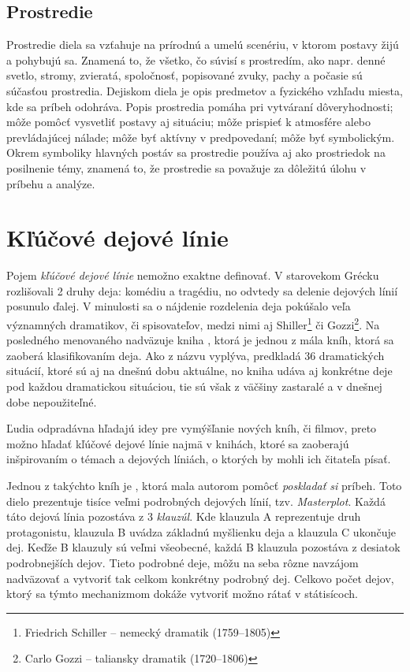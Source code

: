 \subsection*{Prostredie}
Prostredie diela sa vzťahuje na prírodnú a umelú scenériu, v ktorom postavy žijú a pohybujú sa. Znamená to, že všetko, čo súvisí s prostredím, ako napr. denné svetlo, stromy, zvieratá, spoločnosť, popisované zvuky, pachy a počasie sú súčasťou prostredia. Dejiskom diela je opis predmetov a fyzického vzhľadu miesta, kde sa príbeh odohráva.
Popis prostredia pomáha pri vytváraní dôveryhodnosti; môže pomôcť vysvetliť postavy aj situáciu; môže prispieť k atmosfére alebo prevládajúcej nálade; môže byť aktívny v predpovedaní; môže byť symbolickým. Okrem symboliky hlavných postáv sa prostredie používa aj ako prostriedok na posilnenie témy, znamená to, že prostredie sa považuje za dôležitú úlohu v príbehu a analýze.



\section{Kľúčové dejové línie}
\label{kdl}
Pojem \textit{kľúčové dejové línie} nemožno exaktne definovať. V starovekom Grécku rozlišovali 
2 druhy deja: komédiu a tragédiu, no odvtedy sa delenie dejových línií posunulo ďalej. V minulosti sa o nájdenie rozdelenia deja pokúšalo veľa významných dramatikov, či spisovateľov, medzi nimi aj Shiller\footnote{Friedrich Schiller -- nemecký dramatik (1759--1805)} či Gozzi\footnote{Carlo Gozzi -- taliansky dramatik (1720--1806)}. Na posledného menovaného nadväzuje kniha  \cite{Polti:1921}, ktorá je jednou z mála kníh, ktorá sa zaoberá klasifikovaním deja. Ako z názvu vyplýva, predkladá 36 dramatických situácií, ktoré sú aj na dnešnú dobu aktuálne, no kniha udáva aj konkrétne deje pod každou dramatickou situáciou, tie sú však z väčšiny zastaralé a v dnešnej dobe nepoužiteľné.

Ľudia odpradávna hľadajú idey pre vymýšľanie nových kníh, či filmov, preto možno hľadať kľúčové dejové línie najmä v knihách, ktoré sa zaoberajú inšpirovaním o témach a dejových líniách, o ktorých by mohli ich čitateľa písať. 

Jednou z takýchto kníh je  \cite{Cook:1928}, ktorá mala autorom pomôcť \textit{poskladať si} príbeh. Toto dielo prezentuje tisíce veľmi podrobných dejových línií, tzv. \textit{Masterplot}. Každá táto dejová línia pozostáva z 3 \textit{klauzúl}. Kde klauzula A reprezentuje druh protagonistu, klauzula B uvádza základnú myšlienku deja a klauzula C ukončuje dej. Keďže B klauzuly sú veľmi všeobecné, každá B klauzula pozostáva z desiatok podrobnejších dejov. Tieto podrobné deje, môžu na seba rôzne navzájom nadväzovať a vytvoriť tak celkom konkrétny podrobný dej. Celkovo počet dejov, ktorý sa týmto mechanizmom dokáže vytvoriť možno rátať v státisícoch.


